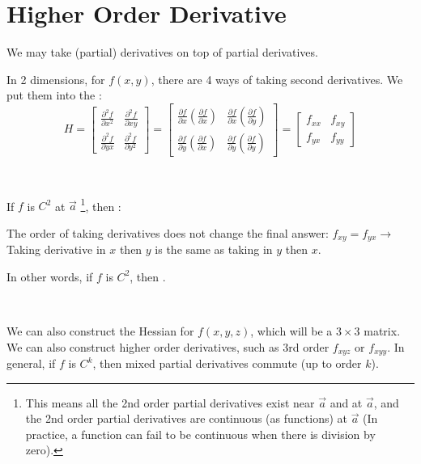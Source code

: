 \documentclass[11pt,fleqn]{book} %
\begin{document}
\section{Higher Order Derivative}

We may take (partial) derivatives on top of partial derivatives. 

In 2 dimensions, for $f(x, y)$, there are 4 ways of taking second derivatives. We put them into the : 
$$H = \begin{bmatrix}
    \frac{\partial^2 f}{\partial x^2} & \frac{\partial^2 f}{\partial xy}  \\
    \frac{\partial^2 f}{\partial yx}  & \frac{\partial^2 f}{\partial y^2}
\end{bmatrix} = \begin{bmatrix}
    \frac{\partial f}{\partial x}\left( \frac{\partial f}{\partial x} \right) & 
    \frac{\partial f}{\partial x}\left( \frac{\partial f}{\partial y} \right)   \\
    \frac{\partial f}{\partial y}\left( \frac{\partial f}{\partial x} \right) & 
    \frac{\partial f}{\partial y}\left( \frac{\partial f}{\partial y} \right)
\end{bmatrix} = \begin{bmatrix}
    f_{xx} & f_{xy} \\ f_{yx} & f_{yy}
\end{bmatrix}$$

{~~~}

If $f$ is $C^2$ at $\vec{a}$ \footnote{This means all the 2nd order partial derivatives exist near $\vec{a}$ and at $\vec{a}$, and the 2nd order partial derivatives are continuous (as functions) at $\vec{a}$ (In practice, a function can fail to be continuous when there is division by zero). }, then :

The order of taking derivatives does not change the final answer: $f_{xy} = f_{yx} \to$ Taking derivative in $x$ then $y$ is the same as taking in $y$ then $x$.

In other words, if $f$ is $C^2$, then .

{~~~}

We can also construct the Hessian for $f(x, y, z)$, which will be a $3 \times 3$ matrix. We can also construct higher order derivatives, such as 3rd order $f_{xyz}$ or $f_{xyy}$. In general, if $f$ is $C^k$, then mixed partial derivatives commute (up to order $k$).
\end{document}
